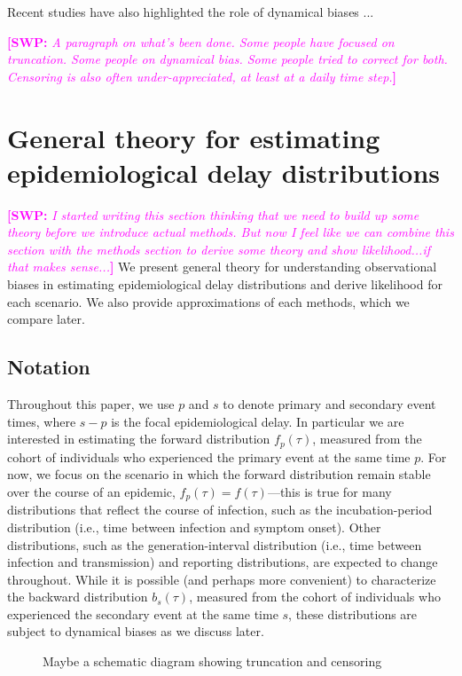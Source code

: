\documentclass[12pt]{article}
\newcommand{\comment}{\showcomment}
\newcommand{\showcomment}[3]{\textcolor{#1}{\textbf{[#2: }\textsl{#3}\textbf{]}}}
\newcommand{\swp}[1]{\comment{magenta}{SWP}{#1}}
\begin{document}
Recent studies have also highlighted the role of dynamical biases ...

\swp{A paragraph on what's been done. Some people have focused on truncation. Some people on dynamical bias. Some people tried to correct for both. Censoring is also often under-appreciated, at least at a daily time step.}

\section{General theory for estimating epidemiological delay distributions}

\swp{I started writing this section thinking that we need to build up some theory before we introduce actual methods. But now I feel like we can combine this section with the methods section to derive some theory and show likelihood...if that makes sense...}
We present general theory for understanding observational biases in estimating epidemiological delay distributions and derive likelihood for each scenario.
We also provide approximations of each methods, which we compare later.

\subsection{Notation}

Throughout this paper, we use $p$ and $s$ to denote primary and secondary event times, where $s-p$ is the focal epidemiological delay.
In particular we are interested in estimating the forward distribution $f_p(\tau)$, measured from the cohort of individuals who experienced the primary event at the same time $p$.
For now, we focus on the scenario in which the forward distribution remain stable over the course of an epidemic, $f_p(\tau) = f(\tau)$---this is true for many distributions that reflect the course of infection, such as the incubation-period distribution (i.e., time between infection and symptom onset).
Other distributions, such as the generation-interval distribution (i.e., time between infection and transmission) and reporting distributions, are expected to change throughout.
While it is possible (and perhaps more convenient) to characterize the backward distribution $b_s(\tau)$, measured from the cohort of individuals who experienced the secondary event at the same time $s$, these distributions are subject to dynamical biases as we discuss later.

\begin{figure}
\caption{Maybe a schematic diagram showing truncation and censoring}
\end{figure}
\end{document}
